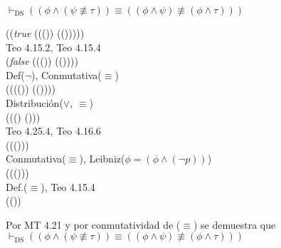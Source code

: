 \documentclass{article}
\begin{document}
\begin{logicenv}[2]{$\vdash_{\text{DS}} ((\phi \land (\psi \not\equiv \tau)) \equiv ((\phi \land \psi) \not\equiv (\phi \land \tau)))$}
\begin{derivation}
            (\neg (\textrm{\textit{true}} \equiv ((\tau \lor (\neg \phi)) \equiv (\psi \lor (\neg \phi)))))\\
        Teo 4.15.2, Teo 4.15.4\\
            (\textrm{\textit{false}} \equiv ((\tau \lor (\neg \phi)) \equiv (\psi \lor (\neg \phi))))\\
        Def($\neg$), Conmutativa($\equiv$)\\
            (\neg ((\tau \lor (\neg \phi)) \equiv (\psi \lor (\neg \phi))))\\
        Distribución($\lor$, $\equiv$)\\
            (\neg ((\neg \phi) \lor (\tau \equiv \psi)))\\
        Teo 4.25.4, Teo 4.16.6\\
            (\phi \land (\neg (\tau \equiv \psi)))\\
        Conmutativa($\equiv$), Leibniz($\phi = (\phi \land (\neg p))$)\\
            (\phi \land (\neg (\psi \equiv \tau)))\\
        Def.($\equiv$), Teo 4.15.4\\
            (\phi \land (\psi \not\equiv \tau))
    \end{derivation}
    Por MT 4.21 y por conmutatividad de ($\equiv$) se demuestra que\\
    $\vdash_{\text{DS}} ((\phi \land (\psi \not\equiv \tau)) \equiv ((\phi \land \psi) \not\equiv (\phi \land \tau)))$
\end{logicenv}
\end{document}
